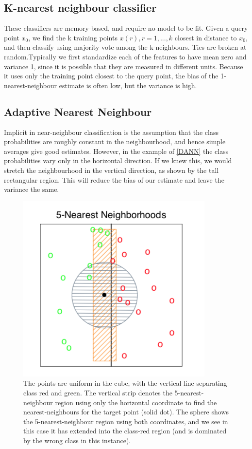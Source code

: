 \documentclass[12pt, letterpaper]{article}
\theoremstyle{definition}
\begin{document}
\subsection{K-nearest neighbour classifier}
These classifiers are memory-based, and require no model to be fit. Given a query point $x_0$, we find the k training points $x(r),r = 1,...,k$ closest in distance to $x_0$, and then classify using majority vote among the k-neighbours. Ties are broken at random.Typically we first standardize each of the features to have mean zero and variance 1, since it is possible that they are measured in different units. Because it uses only the training point closest to the query point, the bias of the 1-nearest-neighbour estimate is often low, but the variance is high.

\subsection{Adaptive Nearest Neighbour}
Implicit in near-neighbour classification is the assumption that the class probabilities are roughly constant in the neighbourhood, and hence simple averages give good estimates.
However, in the example of \autoref{DANN} the class probabilities vary only in the horizontal direction. If we knew this, we would stretch the neighbourhood in the vertical direction, as shown by the tall rectangular region. This will reduce the bias of our estimate and leave the variance the same.

\begin{figure}
\centering
\includegraphics[scale=0.7]{img/DANN}
\caption{The points are uniform in the cube, with the vertical line separating class red and green. The vertical strip denotes the 5-nearest-neighbour region using only the horizontal coordinate to find the nearest-neighbours for the target point (solid dot). The sphere shows the 5-nearest-neighbour region using both coordinates, and we see in this case it has extended into the class-red region (and is dominated by the wrong class in this instance).}
\label{DANN}
\end{figure}
\end{document}
